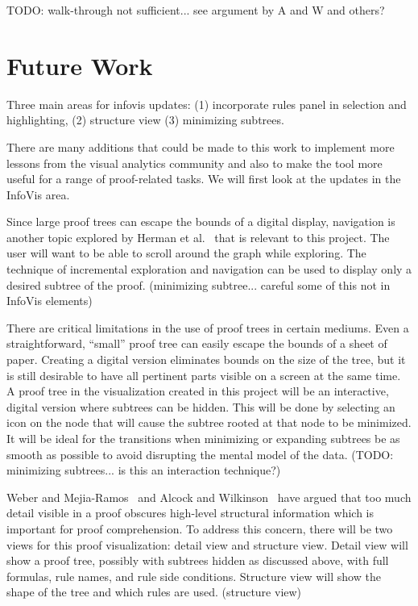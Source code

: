 \documentclass[conference]{IEEEtran}
\begin{document}
TODO: walk-through not sufficient... see argument by A and W and others?


\section{Future Work}
\label{sec:future}

Three main areas for infovis updates: (1) incorporate rules panel in selection and highlighting, (2) structure view (3) minimizing subtrees.

There are many additions that could be made to this work to implement more lessons from the visual analytics community and also to make the tool more useful for a range of proof-related tasks. We will first look at the updates in the InfoVis area.

Since large proof trees can escape the bounds of a digital display, navigation is another topic explored by Herman et al.~\cite{graphvis-herman+melancon+marshall} that is relevant to this project. The user will want to be able to scroll around the graph while exploring. The technique of incremental exploration and navigation can be used to display only a desired subtree of the proof. (minimizing subtree... careful some of this not in InfoVis elements)

There are critical limitations in the use of proof trees in certain mediums. Even a straightforward, ``small'' proof tree can easily escape the bounds of a sheet of paper. Creating a digital version eliminates bounds on the size of the tree, but it is still desirable to have all pertinent parts visible on a screen at the same time. A proof tree in the visualization created in this project will be an interactive, digital version where subtrees can be hidden. This will be done by selecting an icon on the node that will cause the subtree rooted at that node to be minimized. It will be ideal for the transitions when minimizing or expanding subtrees be as smooth as possible to avoid disrupting the mental model of the data. (TODO: minimizing subtrees... is this an interaction technique?)

Weber and Mejia-Ramos~\cite{majorsbeliefs-weber+mejiaramos} and Alcock and Wilkinson~\cite{eproofs-alcock+wilkinson} have argued that too much detail visible in a proof obscures high-level structural information which is important for proof comprehension. To address this concern, there will be two views for this proof visualization: detail view and structure view. Detail view will show a proof tree, possibly with subtrees hidden as discussed above, with full formulas, rule names, and rule side conditions. Structure view will show the shape of the tree and which rules are used. (structure view)
\end{document}
